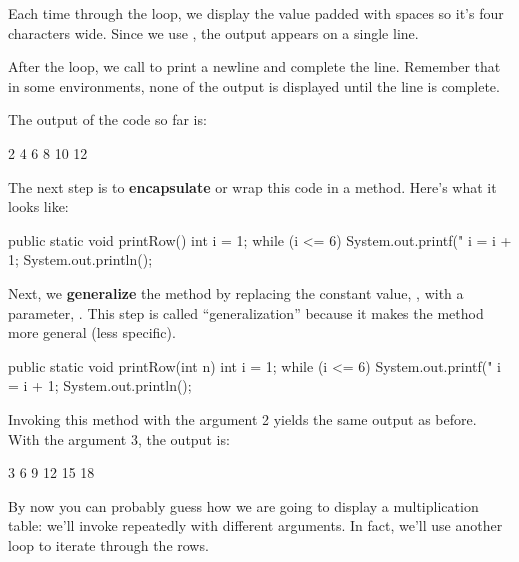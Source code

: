 Each time through the loop, we display the value  padded with spaces so it's four characters wide.
Since we use , the output appears on a single line.

After the loop, we call  to print a newline and complete the line.
Remember that in some environments, none of the output is displayed until the line is complete.

The output of the code so far is:

\begin{stdout}
   2   4   6   8  10  12
\end{stdout}


The next step is to {\bf encapsulate} or wrap this code in a method.
Here's what it looks like:

\begin{code}
public static void printRow() {
    int i = 1;
    while (i <= 6) {
        System.out.printf("%
        i = i + 1;
    }
    System.out.println();
}
\end{code}


Next, we {\bf generalize} the method by replacing the constant value, , with a parameter, .
This step is called ``generalization'' because it makes the method more general (less specific).

\begin{code}
public static void printRow(int n) {
    int i = 1;
    while (i <= 6) {
        System.out.printf("%
        i = i + 1;
    }
    System.out.println();
}
\end{code}

Invoking this method with the argument 2 yields the same output as before.
With the argument 3, the output is:

\begin{stdout}
   3   6   9  12  15  18
\end{stdout}

%

By now you can probably guess how we are going to display a multiplication table: we'll invoke  repeatedly with different arguments.
In fact, we'll use another loop to iterate through the rows.

